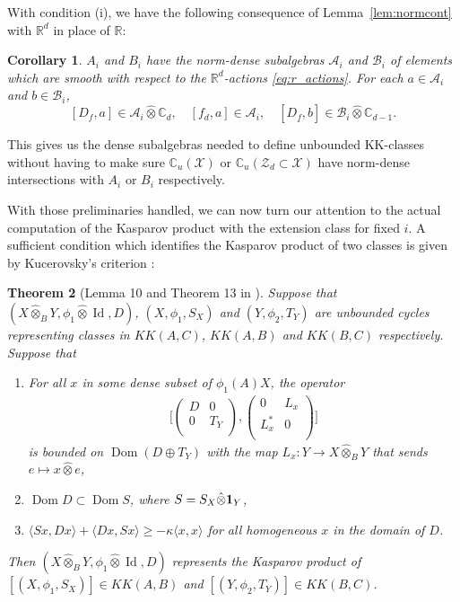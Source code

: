 \documentclass[12pt]{amsart}
\newtheorem{theorem}{Theorem}[section]
\newtheorem{corollary}[theorem]{Corollary}
\newcommand{\CM}{{\mathbb C}}
\newcommand{\RM}{{\mathbb R}}
\newcommand{\Aa}{{\mathcal A}}
\newcommand{\Bb}{{\mathcal B}}
\newcommand{\Xx}{{\mathcal X}}
\newcommand{\Zz}{{\mathcal Z}}
\newcommand{\one}{{\bf 1}}
\DeclareMathOperator*{\Id}{Id}
\DeclareMathOperator*{\Dom}{Dom}
\begin{document}
With condition (i), we have the following consequence of Lemma~\ref{lem:normcont} with $\RM^d$ in place of $\RM$:
\begin{corollary}
\label{cor:commutators_smooth}
$A_i$ and $B_i$ have the norm-dense subalgebras $\Aa_i$ and $\Bb_i$ of elements which are smooth with respect to the $\RM^d$-actions \eqref{eq:r_actions}. For each $a\in \Aa_i$ and $b\in \Bb_i$,
$$[D_f, a]\in \Aa_i \hat{\otimes}\CM_{d}, \quad [f_d, a]\in \Aa_i, \quad [D_{\underline{f}}, b]\in \Bb_i\hat{\otimes}\CM_{d-1}.$$
\end{corollary}
This gives us the dense subalgebras needed to define unbounded KK-classes without having to make sure $\CM_u(\Xx)$ or $\CM_u(\Zz_d\subset \Xx)$ have norm-dense intersections with $A_i$ or $B_i$ respectively.

With those preliminaries handled, we can now turn our attention to the actual computation of the Kasparov product with the extension class for fixed $i$. A sufficient condition which identifies the Kasparov product of two classes is given by Kucerovsky's criterion \cite[Theorem 13]{Kucerovsky}:

\begin{theorem}[Lemma 10 and Theorem 13 in \cite{Kucerovsky}]\label{kucerovsky}
Suppose that $(X \hat{\otimes}_B Y, \phi_1 \hat{\otimes} \Id , D)$, $(X, \phi_1, S_X)$ and $(Y, \phi_2, T_Y)$ are unbounded cycles representing classes in $KK(A,C)$, $KK(A,B)$ and $KK(B,C)$ respectively. Suppose that
\begin{enumerate}
    \item[(i)] For all $x$ in some dense subset of $\phi_1(A)X$, the operator
    \begin{align*}
        \bigg[
        \begin{pmatrix}
        D & 0 \\
        0 & T_Y \\
        \end{pmatrix},
        \begin{pmatrix}
        0 & L_x \\
        L_x^* & 0 \\
        \end{pmatrix}
        \bigg]
    \end{align*}
    is bounded on $\Dom(D \oplus T_Y)$ with the map $L_x \colon Y \to X \hat{\otimes}_BY$ that sends $e \mapsto x \hat{\otimes} e$,
    \item[(ii)] $\Dom D \subset \Dom S$, where $S = S_X \hat{\otimes} \one_Y$,
    \item[(iii)] $\langle S x, Dx \rangle + \langle Dx,  S x \rangle \geq -\kappa \langle x, x \rangle$ for all homogeneous $x$ in the domain of $D$.
\end{enumerate}
Then $(X \hat{\otimes}_B Y, \phi_1 \hat{\otimes} \Id , D)$ represents the Kasparov product of $[(X, \phi_1, S_X)] \in KK(A,B)$ and $[(Y, \phi_2, T_Y)] \in KK(B,C)$.
\end{theorem}
\end{document}
